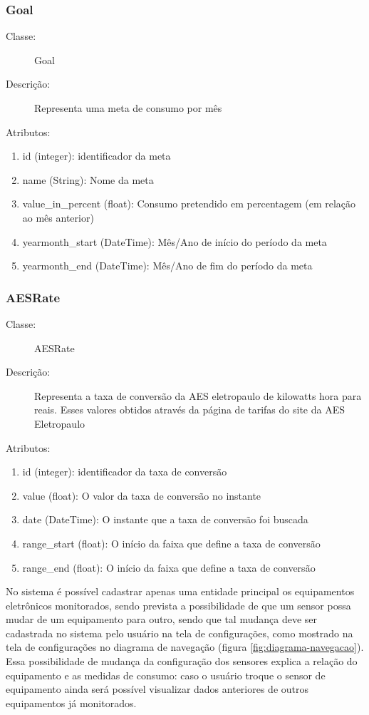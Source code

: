 \subsubsection{Goal}
\begin{description}
	\item[Classe:] Goal
	\item[Descrição:] Representa uma meta de consumo por mês
	\item[Atributos:]
\end{description} 
\begin{enumerate}
	\item id (integer): identificador da meta
	\item name (String):  Nome da meta
	\item value\_in\_percent (float): Consumo pretendido em percentagem (em relação ao mês anterior)
	\item yearmonth\_start (DateTime): Mês/Ano de início do período da meta
    \item yearmonth\_end (DateTime): Mês/Ano de fim do período da meta
\end{enumerate}
%
\subsubsection{AESRate}
\begin{description}
	\item[Classe:] AESRate
	\item[Descrição:] Representa a taxa de conversão da AES eletropaulo de kilowatts hora para reais. Esses valores obtidos através da página de tarifas do site da AES Eletropaulo \cite{aes_site}
	\item[Atributos:]
\end{description} 
\begin{enumerate}
	\item id (integer): identificador da taxa de conversão
	\item value (float): O valor da taxa de conversão no instante
	\item date (DateTime): O instante que a taxa de conversão foi buscada
	\item range\_start (float): O início da faixa que define a taxa de conversão
    \item range\_end (float): O início da faixa que define a taxa de conversão
\end{enumerate}

No sistema é possível cadastrar apenas uma entidade principal os equipamentos eletrônicos monitorados, sendo prevista a possibilidade de que um sensor possa mudar de um equipamento para outro, sendo que tal mudança deve ser cadastrada no sistema pelo  usuário na tela de configurações, como mostrado na tela de configurações no diagrama de navegação (figura \ref{fig:diagrama-navegacao}).  Essa possibilidade de mudança da configuração dos sensores explica a relação do equipamento e as medidas de consumo: caso o usuário troque o sensor de equipamento ainda será possível visualizar dados anteriores de outros equipamentos já monitorados.

